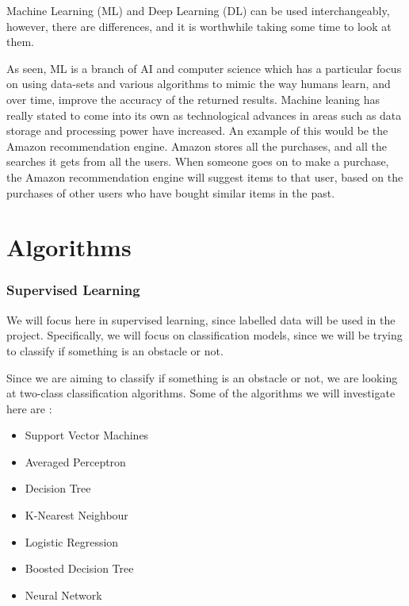 \documentclass[conference]{IEEEtran}
\begin{document}
Machine Learning (ML) and Deep Learning (DL) can be used interchangeably, however, there are differences, and it is worthwhile taking some time to look at them. 

As seen, ML is a branch of AI and computer science which has a particular focus on using data-sets and various algorithms to mimic the way humans learn, and over time, improve the accuracy of the returned results. Machine leaning has really stated to come into its own as technological advances in areas such as data storage and processing power have increased. An example of this would be the Amazon recommendation engine. Amazon stores all the purchases, and all the searches it gets from all the users. When someone goes on to make a purchase, the Amazon recommendation engine will suggest items to that user, based on the purchases of other users who have bought similar items in the past.

\section{Algorithms}
\subsubsection{Supervised Learning}
We will focus here in supervised learning, since labelled data will be used in the project. Specifically, we will focus on classification models, since we will be trying to classify if something is an obstacle or not.

Since we are aiming to classify if something is an obstacle or not, we are looking at two-class classification algorithms. Some of the algorithms we will investigate here are \cite{azure}:


\begin{itemize}
    \item Support Vector Machines
    \item Averaged Perceptron
    \item Decision Tree
    \item K-Nearest Neighbour
    \item Logistic Regression
    \item Boosted Decision Tree
    \item Neural Network
\end{itemize}




\printbibliography
\vspace{12pt}
\end{document}
